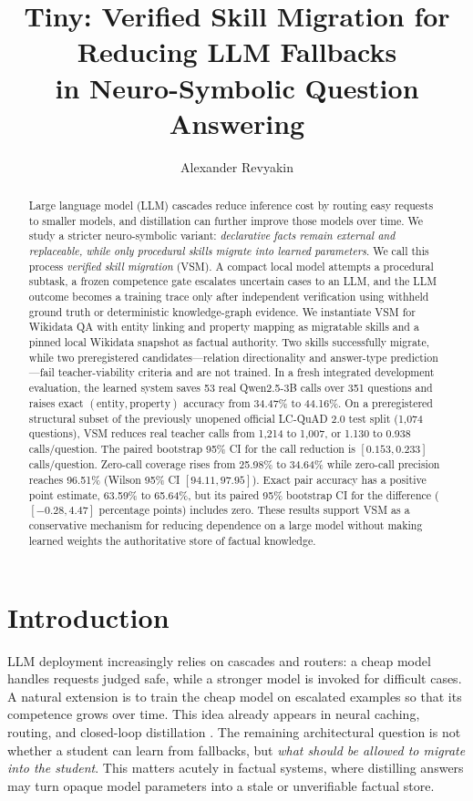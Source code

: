\documentclass[10pt]{article}
\title{Tiny: Verified Skill Migration for Reducing LLM Fallbacks\\in Neuro-Symbolic Question Answering}
\author{Alexander Revyakin}
\date{}
\begin{document}
\maketitle

\begin{abstract}
Large language model (LLM) cascades reduce inference cost by routing easy requests to smaller models, and distillation can further improve those models over time. We study a stricter neuro-symbolic variant: \emph{declarative facts remain external and replaceable, while only procedural skills migrate into learned parameters}. We call this process \emph{verified skill migration} (VSM). A compact local model attempts a procedural subtask, a frozen competence gate escalates uncertain cases to an LLM, and the LLM outcome becomes a training trace only after independent verification using withheld ground truth or deterministic knowledge-graph evidence. We instantiate VSM for Wikidata QA with entity linking and property mapping as migratable skills and a pinned local Wikidata snapshot as factual authority. Two skills successfully migrate, while two preregistered candidates---relation directionality and answer-type prediction---fail teacher-viability criteria and are not trained. In a fresh integrated development evaluation, the learned system saves 53 real Qwen2.5-3B calls over 351 questions and raises exact $(\mathrm{entity},\mathrm{property})$ accuracy from 34.47\% to 44.16\%. On a preregistered structural subset of the previously unopened official LC-QuAD 2.0 test split (1,074 questions), VSM reduces real teacher calls from 1,214 to 1,007, or 1.130 to 0.938 calls/question. The paired bootstrap 95\% CI for the call reduction is $[0.153,0.233]$ calls/question. Zero-call coverage rises from 25.98\% to 34.64\% while zero-call precision reaches 96.51\% (Wilson 95\% CI $[94.11,97.95]$). Exact pair accuracy has a positive point estimate, 63.59\% to 65.64\%, but its paired 95\% bootstrap CI for the difference ($[-0.28,4.47]$ percentage points) includes zero. These results support VSM as a conservative mechanism for reducing dependence on a large model without making learned weights the authoritative store of factual knowledge.
\end{abstract}

\section{Introduction}

LLM deployment increasingly relies on cascades and routers: a cheap model handles requests judged safe, while a stronger model is invoked for difficult cases. A natural extension is to train the cheap model on escalated examples so that its competence grows over time. This idea already appears in neural caching, routing, and closed-loop distillation \cite{ramirez2024cache,ong2024routellm,guo2026routenlp,yao2026mera}. The remaining architectural question is not whether a student can learn from fallbacks, but \emph{what should be allowed to migrate into the student}. This matters acutely in factual systems, where distilling answers may turn opaque model parameters into a stale or unverifiable factual store.
\end{document}
